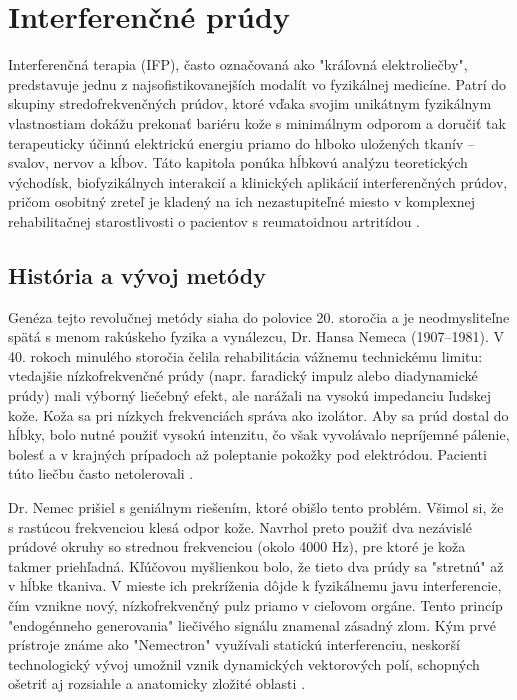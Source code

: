\chapter{Interferenčné prúdy}

Interferenčná terapia (IFP), často označovaná ako "kráľovná elektroliečby", predstavuje jednu z najsofistikovanejších modalít vo fyzikálnej medicíne. Patrí do skupiny stredofrekvenčných prúdov, ktoré vďaka svojim unikátnym fyzikálnym vlastnostiam dokážu prekonať bariéru kože s minimálnym odporom a doručiť tak terapeuticky účinnú elektrickú energiu priamo do hlboko uložených tkanív – svalov, nervov a kĺbov. Táto kapitola ponúka hĺbkovú analýzu teoretických východísk, biofyzikálnych interakcií a klinických aplikácií interferenčných prúdov, pričom osobitný zreteľ je kladený na ich nezastupiteľné miesto v komplexnej rehabilitačnej starostlivosti o pacientov s reumatoidnou artritídou \parencite{Capko2010}.

\section{História a vývoj metódy}

Genéza tejto revolučnej metódy siaha do polovice 20. storočia a je neodmysliteľne spätá s menom rakúskeho fyzika a vynálezcu, Dr. Hansa Nemeca (1907–1981). V 40. rokoch minulého storočia čelila rehabilitácia vážnemu technickému limitu: vtedajšie nízkofrekvenčné prúdy (napr. faradický impulz alebo diadynamické prúdy) mali výborný liečebný efekt, ale narážali na vysokú impedanciu ľudskej kože.
Koža sa pri nízkych frekvenciách správa ako izolátor. Aby sa prúd dostal do hĺbky, bolo nutné použiť vysokú intenzitu, čo však vyvolávalo nepríjemné pálenie, bolesť a v krajných prípadoch až poleptanie pokožky pod elektródou. Pacienti túto liečbu často netolerovali \parencite{Capko2010}.

Dr. Nemec prišiel s geniálnym riešením, ktoré obišlo tento problém. Všimol si, že s rastúcou frekvenciou klesá odpor kože. Navrhol preto použiť dva nezávislé prúdové okruhy so strednou frekvenciou (okolo 4000 Hz), pre ktoré je koža takmer priehľadná. Kľúčovou myšlienkou bolo, že tieto dva prúdy sa "stretnú" až v hĺbke tkaniva. V mieste ich prekríženia dôjde k fyzikálnemu javu interferencie, čím vznikne nový, nízkofrekvenčný pulz priamo v cieľovom orgáne. Tento princíp "endogénneho generovania" liečivého signálu znamenal zásadný zlom. Kým prvé prístroje známe ako "Nemectron" využívali statickú interferenciu, neskorší technologický vývoj umožnil vznik dynamických vektorových polí, schopných ošetriť aj rozsiahle a anatomicky zložité oblasti \parencite{Podebradsky2009, Goats1990}.

